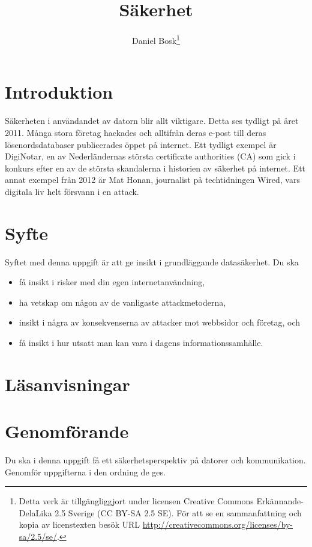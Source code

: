 \documentclass[a4paper,nocourse]{miunasgn}
\title{Säkerhet}
\author{Daniel Bosk\footnote{%
	Detta verk är tillgängliggjort under licensen Creative Commons 
	Erkännande-DelaLika 2.5 Sverige (CC BY-SA 2.5 SE).
	För att se en sammanfattning och kopia av licenstexten besök URL 
	\url{http://creativecommons.org/licenses/by-sa/2.5/se/}.
}}
\date{\svnId}
\begin{document}
\maketitle
\thispagestyle{foot}
\tableofcontents


\section{Introduktion}
\label{sec:Introduktion}
\noindent
Säkerheten i användandet av datorn blir allt viktigare.
Detta ses tydligt på året 2011.
Många stora företag hackades och alltifrån deras e-post till deras 
lösenordsdatabaser publicerades öppet på internet.
Ett tydligt exempel är DigiNotar, en av Nederländernas största certificate 
authorities (CA) som gick i konkurs efter en av de största skandalerna 
i historien av säkerhet på internet.
Ett annat exempel från 2012 är Mat Honan, journalist på techtidningen Wired, 
vars digitala liv helt försvann i en attack.


\section{Syfte}
\label{sec:Syfte}
\noindent
Syftet med denna uppgift är att ge insikt i grundläggande datasäkerhet.
Du ska
\begin{itemize}
	\item få insikt i risker med din egen internetanvändning,
	\item ha vetskap om någon av de vanligaste attackmetoderna,
	\item insikt i några av konsekvenserna av attacker mot webbsidor och
		företag, och
	\item få insikt i hur utsatt man kan vara i dagens informationssamhälle.
\end{itemize}


\section{Läsanvisningar}
\label{sec:Lasanvisningar}
\noindent



\section{Genomförande}
\label{sec:Genomforande}
\noindent
Du ska i denna uppgift få ett säkerhetsperspektiv på datorer och kommunikation.
Genomför uppgifterna i den ordning de ges.
\end{document}
